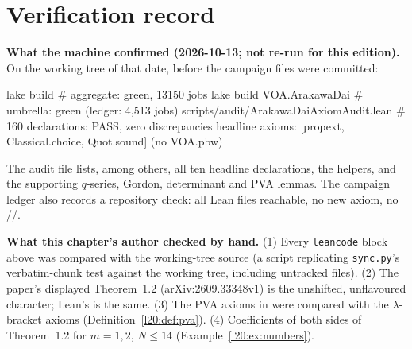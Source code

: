 \section{Verification record}\label{l20:sec:verification}

\textbf{What the machine confirmed (2026-10-13; not re-run for this edition).} On the working tree of that date, before the
campaign files were committed:
\begin{plaincode}
lake build                                   # aggregate: green, 13150 jobs
lake build VOA.ArakawaDai                    # umbrella: green (ledger: 4,513 jobs)
scripts/audit/ArakawaDaiAxiomAudit.lean      # 160 declarations: PASS, zero discrepancies
  headline axioms: [propext, Classical.choice, Quot.sound]   (no VOA.pbw)
\end{plaincode}
The audit file lists, among others, all ten headline declarations, the  helpers, and the
supporting $q$-series, Gordon, determinant and PVA lemmas. The campaign ledger also records a repository check: all Lean
files reachable, no new axiom, no //.

\textbf{What this chapter's author checked by hand.} (1) Every \texttt{leancode} block above was compared with the working-tree
source (a script replicating \texttt{sync.py}'s verbatim-chunk test against the working tree, including untracked files).
(2) The paper's displayed Theorem~1.2 (arXiv:2609.33348v1) is the unshifted, unflavoured character; Lean's 
is the same. (3) The PVA axioms in  were compared with the $\lambda$-bracket axioms
(Definition~\ref{l20:def:pva}). (4) Coefficients of both sides of Theorem~1.2 for $m=1,2$, $N\le14$
(Example~\ref{l20:ex:numbers}).

